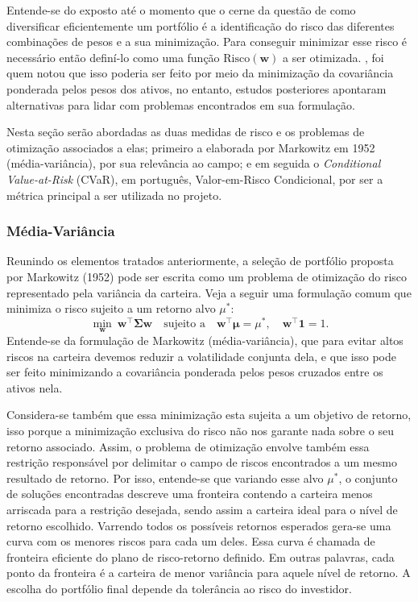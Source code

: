\documentclass[12pt,a4paper]{article}
\begin{document}
Entende-se do exposto até o momento que o cerne da questão de como diversificar eficientemente um portfólio é a identificação do risco das diferentes combinações de pesos e a sua minimização.
Para conseguir minimizar esse risco é necessário então definí-lo como uma função $\mathrm{Risco}(\mathbf{w})$ a ser otimizada. 
, foi quem notou que isso poderia ser feito por meio da minimização da covariância ponderada pelos pesos dos ativos, no entanto, estudos posteriores apontaram alternativas para lidar com problemas encontrados em sua formulação. 

Nesta seção serão abordadas as duas medidas de risco e os problemas de otimização associados a elas; 
primeiro a elaborada por Markowitz em 1952 (média-variância), por sua relevância ao campo; e em seguida o \textit{Conditional Value-at-Risk} (CVaR), em português, Valor-em-Risco Condicional, por ser a métrica principal a ser utilizada no projeto.

\subsubsection{Média-Variância}
\label{sec: med var}

Reunindo os elementos tratados anteriormente, 
a seleção de portfólio proposta por Markowitz (1952) 
pode ser escrita como um problema de otimização do risco representado pela variância da carteira. 
Veja a seguir uma formulação comum que minimiza o risco sujeito a um retorno alvo $\mu^\ast$:
\begin{equation}
\min_{\mathbf{w}} \ \mathbf{w}^\top \boldsymbol{\Sigma} \mathbf{w}
\quad \text{sujeito a} \quad
\mathbf{w}^\top \boldsymbol{\mu} = \mu^\ast, \quad \mathbf{w}^\top \mathbf{1} = 1.
\label{eq:markowitz}
\end{equation}
Entende-se da formulação de Markowitz (média-variância), que para evitar altos riscos na carteira devemos reduzir a volatilidade conjunta dela, 
e que isso pode ser feito minimizando a covariância ponderada pelos pesos cruzados entre os ativos nela. 

Considera-se também que essa minimização esta sujeita a um objetivo de retorno, isso porque a minimização exclusiva do risco não nos garante nada sobre o seu retorno associado. Assim, o problema de otimização envolve também essa restrição responsável por delimitar o campo de riscos encontrados a um mesmo resultado de retorno. Por isso, entende-se que variando esse alvo $\mu^\ast$, 
o conjunto de soluções encontradas descreve uma fronteira contendo a carteira menos arriscada para a restrição desejada, sendo assim a carteira ideal para o nível de retorno escolhido. Varrendo todos os possíveis retornos esperados gera-se uma curva com os menores riscos para cada um deles. Essa curva é chamada de fronteira eficiente do plano de risco-retorno definido. Em outras palavras, cada ponto da fronteira é a carteira de menor variância para aquele nível de retorno. A escolha do portfólio final depende da tolerância ao risco do investidor.
\end{document}
